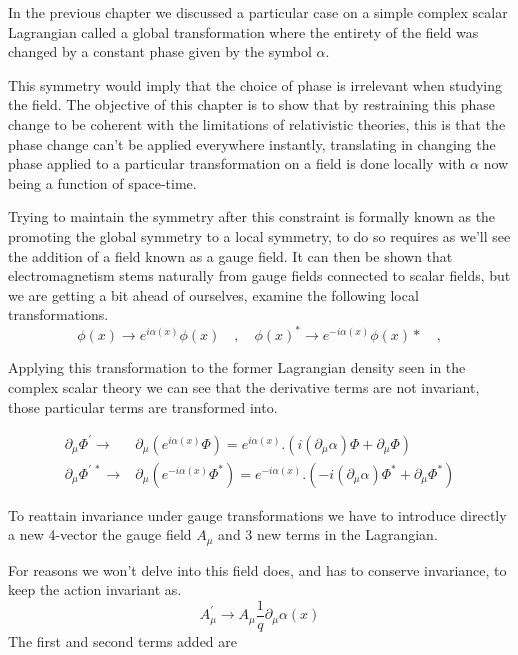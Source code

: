 \documentclass[11pt,twoside,a4paper]{article}
\begin{document}
In the previous chapter we discussed a particular case on a simple complex scalar Lagrangian called a global transformation where the entirety of the field was changed by a constant phase given by the symbol $\alpha$.


This symmetry would imply that the choice of phase is irrelevant when studying the field. The objective of this chapter is to show that by restraining this phase change to be coherent with the limitations of relativistic theories, this is that the phase change can't be applied everywhere instantly, translating in changing the phase applied to a particular transformation on a field is done locally with $\alpha$ now being a function of space-time. 

Trying to maintain the symmetry after this constraint is formally known as the promoting the global symmetry to a local symmetry, to do so requires as we'll see the addition of a field known as a gauge field. It can then be shown that electromagnetism stems naturally from gauge fields connected to scalar fields, but we are getting a bit ahead of ourselves, examine the following local transformations. 
\begin{equation}
\phi(x) \rightarrow e^{i \alpha (x)} \phi (x) \quad , \quad \phi(x)^* \rightarrow e^{-i \alpha (x)} \phi (x)*  \quad ,
\end{equation}
 
Applying this transformation to the former Lagrangian density seen in the complex scalar theory we can see that the derivative terms are not invariant, those particular terms are transformed into. 

\begin{align}
\partial_\mu \Phi^\prime \rightarrow &  \partial_\mu \left(e^{i \alpha(x)} \Phi \right) = e^{i \alpha \left(x\right)}.\left( i (\partial_\mu \alpha )  \Phi + \partial_\mu \Phi \right) \\
\partial_\mu \Phi^{\prime \ *} \rightarrow &  \partial_\mu \left( e^{-i \alpha \left(x \right)} \Phi^* \right) =  e^{-i \alpha \left(x \right)}.\left(  -i (\partial_\mu \alpha )  \Phi^* + \partial_\mu \Phi^* \right)
\end{align}

To reattain invariance under gauge transformations we have to introduce directly a new 4-vector the gauge field $A_\mu$ and 3 new terms in the Lagrangian.

For reasons we won't delve into this field does, and has to conserve invariance, to keep the action invariant as. 
\begin{equation}
A_\mu^\prime \rightarrow A_\mu \frac{1}{q} \partial_\mu \alpha \left(x \right) 
\end{equation} 
The first and second terms added are 
\end{document}
